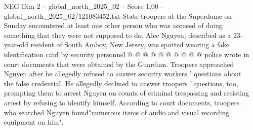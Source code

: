 \begin{textsample}{NEG Dim 2 – global\_north\_2025\_02 – Score 1.00 – global\_north\_2025\_02/121083452.txt}
State troopers at the Superdome on Sunday encountered at least one other person who was accused of doing something that they were not supposed to do.
Alec Nguyen, described as a 23-year-old resident of South Amboy, New Jersey, was spotted wearing a fake identification card by security personnel @ @ @ @ @ @ @ @ @ @ police wrote in court documents that were obtained by the Guardian.
Troopers approached Nguyen after he allegedly refused to answer security workers ' questions about the false credential.
He allegedly declined to answer troopers ' questions, too, prompting them to arrest Nguyen on counts of criminal trespassing and resisting arrest by refusing to identify himself.
According to court documents, troopers who searched Nguyen found"numerous items of audio and visual recording equipment on him".

\end{textsample}
